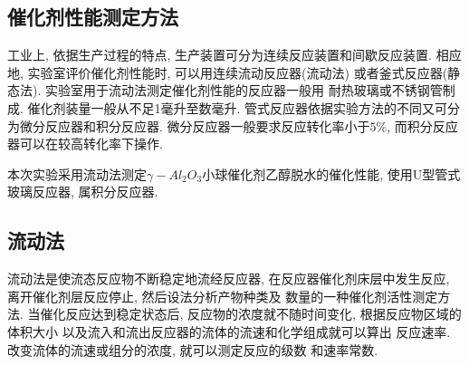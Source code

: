 \documentclass[a4paper]{article}
\begin{document}
\subsection{催化剂性能测定方法}
工业上, 依据生产过程的特点, 生产装置可分为连续反应装置和间歇反应装置. 
相应地, 实验室评价催化剂性能时, 可以用连续流动反应器(流动法)
或者釜式反应器(静态法). 实验室用于流动法测定催化剂性能的反应器一般用
耐热玻璃或不锈钢管制成. 催化剂装量一般从不足1毫升至数毫升.
管式反应器依据实验方法的不同又可分为微分反应器和积分反应器.
微分反应器一般要求反应转化率小于$5\%$, 而积分反应器可以在较高转化率下操作.
\par
本次实验采用流动法测定$\gamma-Al_2O_3$小球催化剂乙醇脱水的催化性能,
使用U型管式玻璃反应器, 属积分反应器.
\subsection{流动法}
流动法是使流态反应物不断稳定地流经反应器, 
在反应器催化剂床层中发生反应, 
离开催化剂层反应停止, 然后设法分析产物种类及
数量的一种催化剂活性测定方法. 当催化反应达到稳定状态后, 
反应物的浓度就不随时间变化, 根据反应物区域的体积大小
以及流入和流出反应器的流体的流速和化学组成就可以算出
反应速率. 改变流体的流速或组分的浓度, 就可以测定反应的级数
和速率常数.
\end{document}
